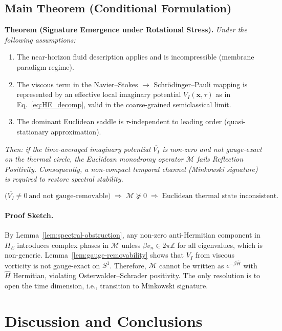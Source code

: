 \documentclass[11pt]{article}
\begin{document}
\subsection{Main Theorem (Conditional Formulation)}

\textbf{Theorem (Signature Emergence under Rotational Stress).}
\emph{Under the following assumptions:}
\begin{enumerate}[label=(\Alph*)]
    \item The near-horizon fluid description applies and is incompressible (membrane paradigm regime).
    \item The viscous term in the Navier–Stokes $\to$ Schr\"odinger–Pauli mapping is represented by an effective local imaginary potential $V_I(\mathbf{x},\tau)$ as in Eq.~\eqref{eq:HE_decomp}, valid in the coarse-grained semiclassical limit.
    \item The dominant Euclidean saddle is $\tau$-independent to leading order (quasi-stationary approximation).
\end{enumerate}
\emph{Then: if the time-averaged imaginary potential $\overline{V_I}$ is non-zero and not gauge-exact on the thermal circle, the Euclidean monodromy operator $\mathcal{M}$ fails Reflection Positivity. Consequently, a non-compact temporal channel (Minkowski signature) is required to restore spectral stability.}

\begin{equation}
\boxed{
\big( \overline{V_I} \neq 0 \ \text{and not gauge-removable} \big)
\;\Longrightarrow\;
\mathcal{M} \not\succeq 0
\;\Longrightarrow\;
\text{Euclidean thermal state inconsistent.}
}
\end{equation}

\paragraph{Proof Sketch.}
By Lemma~\ref{lem:spectral-obstruction}, any non-zero anti-Hermitian component in $H_E$ introduces complex phases in $\mathcal{M}$ unless $\beta v_n \in 2\pi\mathbb{Z}$ for all eigenvalues, which is non-generic. Lemma~\ref{lem:gauge-removability} shows that $V_I$ from viscous vorticity is not gauge-exact on $S^1$. Therefore, $\mathcal{M}$ cannot be written as $e^{-\beta \widehat{H}}$ with $\widehat{H}$ Hermitian, violating Osterwalder–Schrader positivity. The only resolution is to open the time dimension, i.e., transition to Minkowski signature.

\section{Discussion and Conclusions}
\end{document}
